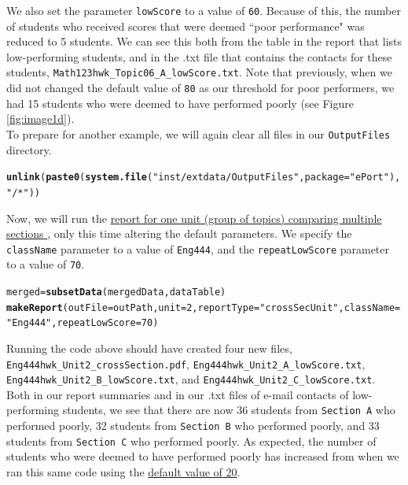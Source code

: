 \documentclass{article}\usepackage[]{graphicx}\usepackage[]{color}
\makeatletter
\newcommand{\hlnum}[1]{\textcolor[rgb]{0.686,0.059,0.569}{#1}}%
\newcommand{\hlstr}[1]{\textcolor[rgb]{0.192,0.494,0.8}{#1}}%
\newcommand{\hlstd}[1]{\textcolor[rgb]{0.345,0.345,0.345}{#1}}%
\newcommand{\hlkwb}[1]{\textcolor[rgb]{0.69,0.353,0.396}{#1}}%
\newcommand{\hlkwc}[1]{\textcolor[rgb]{0.333,0.667,0.333}{#1}}%
\newcommand{\hlkwd}[1]{\textcolor[rgb]{0.737,0.353,0.396}{\textbf{#1}}}%
\newenvironment{kframe}{%
 \def\at@end@of@kframe{}%
 \ifinner\ifhmode%
  \def\at@end@of@kframe{\end{minipage}}%
  \begin{minipage}{\columnwidth}%
 \fi\fi%
 \def\FrameCommand##1{\hskip\@totalleftmargin \hskip-\fboxsep
 \colorbox{shadecolor}{##1}\hskip-\fboxsep
     \hskip-\linewidth \hskip-\@totalleftmargin \hskip\columnwidth}%
 \MakeFramed {\advance\hsize-\width
   \@totalleftmargin\z@ \linewidth\hsize
   \@setminipage}}%
 {\par\unskip\endMakeFramed%
 \at@end@of@kframe}
\newenvironment{knitrout}{}{} %
\numberwithin{equation}{section} %
\makeatother
\begin{document}
We also set the parameter \texttt{lowScore} to a value of \texttt{60}. Because of this, the number of students who received scores that were deemed ``poor performance" was reduced to 5 students. We can see this both from the table in the report that lists low-performing students, and in the .txt file that contains the contacts for these students, \texttt{Math123hwk\_Topic06\_A\_lowScore.txt}. Note that previously, when we did not changed the default value of \texttt{80} as our threshold for poor performers, we had 15 students who were deemed to have performed poorly (see Figure \ref{fig:image1d}).\\

To prepare for another example, we will again clear all files in our \texttt{OutputFiles} directory.

\begin{knitrout}
\color{fgcolor}\begin{kframe}
\begin{alltt}
\hlkwd{unlink}\hlstd{(}\hlkwd{paste0}\hlstd{(}\hlkwd{system.file}\hlstd{(}\hlstr{"inst/extdata/OutputFiles"}\hlstd{,} \hlkwc{package} \hlstd{=} \hlstr{"ePort"}\hlstd{),} \hlstr{"/*"}\hlstd{))}
\end{alltt}
\end{kframe}
\end{knitrout}

Now, we will run the \hyperref[sec:crossSecU]{report for one unit (group of topics) comparing multiple sections }, only this time altering the default parameters. We specify the \texttt{className} parameter to a value of \texttt{Eng444}, and the \texttt{repeatLowScore} parameter to a value of \texttt{70}.

\begin{knitrout}
\color{fgcolor}\begin{kframe}
\begin{alltt}
\hlstd{merged} \hlkwb{=} \hlkwd{subsetData}\hlstd{(mergedData, dataTable)}
\hlkwd{makeReport}\hlstd{(}\hlkwc{outFile} \hlstd{= outPath,} \hlkwc{unit} \hlstd{=} \hlnum{2}\hlstd{,} \hlkwc{reportType} \hlstd{=} \hlstr{"crossSecUnit"}\hlstd{,} \hlkwc{className} \hlstd{=}
  \hlstr{"Eng444"}\hlstd{,} \hlkwc{repeatLowScore} \hlstd{=} \hlnum{70}\hlstd{)}
\end{alltt}
\end{kframe}
\end{knitrout}

Running the code above should have created four new files, \texttt{Eng444hwk\_Unit2\_crossSection.pdf}, \texttt{Eng444hwk\_Unit2\_A\_lowScore.txt}, \texttt{Eng444hwk\_Unit2\_B\_lowScore.txt}, and \texttt{Eng444hwk\_Unit2\_C\_lowScore.txt}. Both in our report summaries and in our .txt files of e-mail contacts of low-performing students, we see that there are now 36 students from \texttt{Section A} who performed poorly, 32 students from \texttt{Section B} who performed poorly, and 33 students from \texttt{Section C} who performed poorly. As expected, the number of students who were deemed to have performed poorly has increased from when we ran this same code using the \hyperref[sec:lowPer]{default value of 20}.
\end{document}
